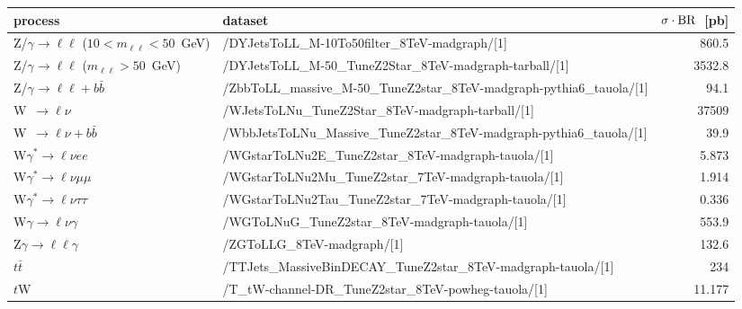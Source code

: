\documentclass[a4paper]{article}
\begin{document}
\begin{landscape}

\begin{table}[ht]
\begin{small}
\centering
\begin{tabular}{l|l|r}
\hline
 process                                              & dataset                                                                & $\sigma\cdot\rm{BR}$~[pb]\\
\hline
 Z/$\gamma\to\ell\ell$ ($10 < m_{\ell\ell} < 50$~GeV) & /DYJetsToLL\_M-10To50filter\_8TeV-madgraph/[1]                         &   860.5\\
 Z/$\gamma\to\ell\ell$ ($m_{\ell\ell} > 50$~GeV)      & /DYJetsToLL\_M-50\_TuneZ2Star\_8TeV-madgraph-tarball/[1]               &  3532.8\\
 Z/$\gamma\to\ell\ell + b\bar{b}$                     & /ZbbToLL\_massive\_M-50\_TuneZ2star\_8TeV-madgraph-pythia6\_tauola/[1] &    94.1\\
 W~$\to\ell\nu$                                       & /WJetsToLNu\_TuneZ2Star\_8TeV-madgraph-tarball/[1]                     &   37509\\
 W~$\to\ell\nu + b\bar{b}$                            & /WbbJetsToLNu\_Massive\_TuneZ2star\_8TeV-madgraph-pythia6\_tauola/[1]  &    39.9\\
 W$\gamma^{*}\to\ell\nu ee$                           & /WGstarToLNu2E\_TuneZ2star\_8TeV-madgraph-tauola/[1]                   &   5.873\\
 W$\gamma^{*}\to\ell\nu\mu\mu$                        & /WGstarToLNu2Mu\_TuneZ2star\_7TeV-madgraph-tauola/[1]                  &   1.914\\
 W$\gamma^{*}\to\ell\nu\tau\tau$                      & /WGstarToLNu2Tau\_TuneZ2star\_7TeV-madgraph-tauola/[1]                 &   0.336\\
 W$\gamma\to\ell\nu\gamma$                            & /WGToLNuG\_TuneZ2star\_8TeV-madgraph-tauola/[1]                        &   553.9\\
 Z$\gamma\to\ell\ell\gamma$                           & /ZGToLLG\_8TeV-madgraph/[1]                                            &   132.6\\
 $t\bar{t}$                                           & /TTJets\_MassiveBinDECAY\_TuneZ2star\_8TeV-madgraph-tauola/[1]         &     234\\
 $t$W                                                 & /T\_tW-channel-DR\_TuneZ2star\_8TeV-powheg-tauola/[1]                  &  11.177\\

\end{tabular}
\end{small}
\end{table}
\end{landscape}
\end{document}
